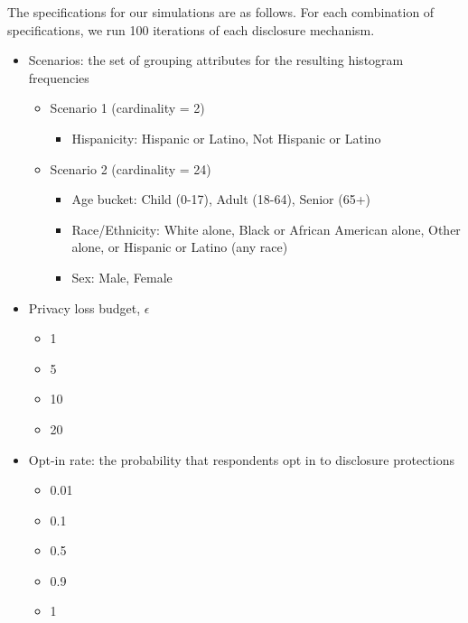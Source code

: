 \documentclass[
]{urban-formatting}
\providecommand{\tightlist}{%
  \setlength{\itemsep}{0pt}\setlength{\parskip}{0pt}}\usepackage{longtable,booktabs,array}
\begin{document}
The specifications for our simulations are as follows. For each
combination of specifications, we run 100 iterations of each disclosure
mechanism.

\begin{itemize}
\tightlist
\item
  Scenarios: the set of grouping attributes for the resulting histogram
  frequencies

  \begin{itemize}
  \tightlist
  \item
    Scenario 1 (cardinality = 2)

    \begin{itemize}
    \tightlist
    \item
      Hispanicity: Hispanic or Latino, Not Hispanic or Latino
    \end{itemize}
  \item
    Scenario 2 (cardinality = 24)

    \begin{itemize}
    \item
      Age bucket: Child (0-17), Adult (18-64), Senior (65+)
    \item
      Race/Ethnicity: White alone, Black or African American alone,
      Other alone, or Hispanic or Latino (any race)
    \item
      Sex: Male, Female
    \end{itemize}
  \end{itemize}
\item
  Privacy loss budget, \(\epsilon\)

  \begin{itemize}
  \tightlist
  \item
    1
  \item
    5
  \item
    10
  \item
    20
  \end{itemize}
\item
  Opt-in rate: the probability that respondents opt in to disclosure
  protections

  \begin{itemize}
  \item
    0.01
  \item
    0.1
  \item
    0.5
  \item
    0.9
  \item
    1
  \end{itemize}
\end{itemize}
\end{document}
